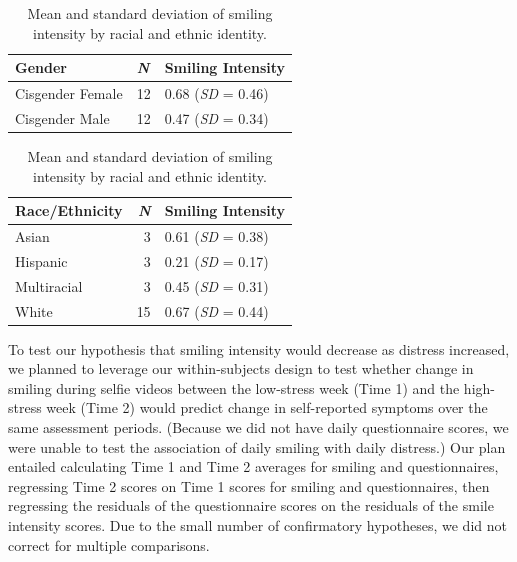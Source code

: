 \documentclass[authordate, empirical,issue]{jote-new-article}
\begin{document}
\begin{table}[th!]
  \begin{fullwidth}

    \caption{Mean and standard deviation of smiling intensity by gender.}
    \begin{tabularx}{\linewidth}{@{} X l l @{}}
      \toprule
      \textbf{Gender}  & \textbf{\emph{N}} & \textbf{Smiling Intensity} \\
      \midrule

      Cisgender Female & 12                & 0.68 (\textit{SD} = 0.46)  \\

      Cisgender Male   & 12                & 0.47 (\textit{SD} = 0.34)  \\
      \bottomrule
    \end{tabularx}


    \vspace*{2\baselineskip}
    \caption{Mean and standard deviation of smiling intensity by racial and ethnic identity.}
    \begin{tabularx}{\linewidth}{@{} X r l @{}}
      \toprule
      \textbf{Race/Ethnicity} & \textbf{\textit{N}} & \textbf{Smiling Intensity} \\
      \midrule


      Asian                   & 3                   & 0.61 (\textit{SD} = 0.38)  \\

      Hispanic                & 3                   & 0.21 (\textit{SD} = 0.17)  \\

      Multiracial             & 3                   & 0.45 (\textit{SD} = 0.31)  \\

      White                   & 15                  & 0.67 (\textit{SD} = 0.44)  \\
      \bottomrule
    \end{tabularx}
  \end{fullwidth}
\end{table}


To test our hypothesis that smiling intensity would decrease as distress increased, we planned to leverage our within-subjects design to test whether change in smiling during selfie videos between the low-stress week (Time 1) and the high-stress week (Time 2) would predict change in self-reported symptoms over the same assessment periods. (Because we did not have daily questionnaire scores, we were unable to test the association of daily smiling with daily distress.) Our plan entailed calculating Time 1 and Time 2 averages for smiling and questionnaires, regressing Time 2 scores on Time 1 scores for smiling and questionnaires, then regressing the residuals of the questionnaire scores on the residuals of the smile intensity scores. Due to the small number of confirmatory hypotheses, we did not correct for multiple comparisons.
\end{document}

